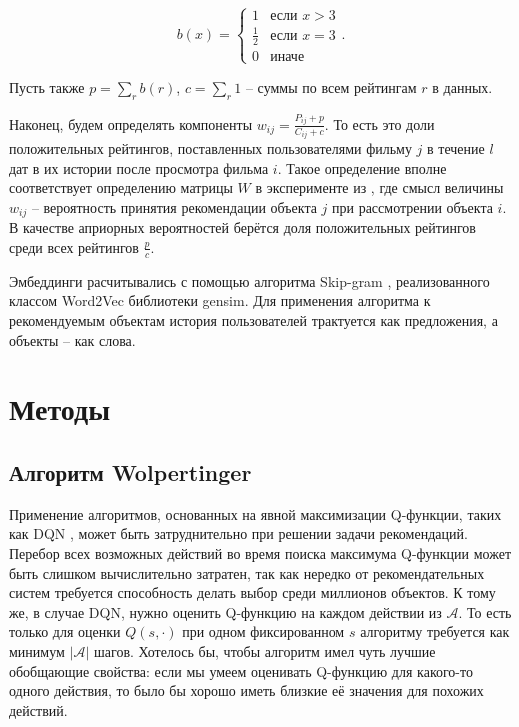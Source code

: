 \documentclass[a4paper, 12pt]{article}
\begin{document}
$$
b(x)=
	\begin{cases}
		1 & \text{если } x > 3\\
		\frac12 & \text{если } x = 3\\
		0 & \text{иначе} 
	\end{cases}.
$$

Пусть также $p = \sum_r b(r)$, $c = \sum_r 1$ -- суммы по всем рейтингам $r$ в данных.

Наконец, будем определять компоненты $w_{ij} = \frac{P_{ij} + p}{C_{ij} + c}$.
То есть это доли положительных рейтингов, поставленных пользователями фильму $j$ в течение $l$ дат в их истории после просмотра фильма $i$. Такое определение вполне соответствует определению матрицы $W$ в эксперименте из \cite{wolpertinger}, где смысл величины $w_{ij}$ -- вероятность принятия рекомендации объекта $j$ при рассмотрении объекта $i$.
В качестве априорных вероятностей берётся доля положительных рейтингов среди всех рейтингов $\frac{p}{c}$.

Эмбеддинги расчитывались с помощью алгоритма Skip-gram \cite{skip_gram}, реализованного классом Word2Vec  библиотеки gensim. Для применения алгоритма к рекомендуемым объектам история пользователей трактуется как предложения, а объекты -- как слова. 




\section{Методы}

\subsection{Алгоритм Wolpertinger}

Применение алгоритмов, основанных на явной максимизации Q-функ\-ции, таких как DQN \cite{dqn}, может быть затруднительно при решении задачи рекомендаций. 
Перебор всех возможных действий во время поиска максимума Q-функции может быть слишком вычислительно затратен, так как нередко от рекомендательных систем требуется способность делать выбор среди миллионов объектов.
К тому же, в случае DQN, нужно оценить Q-функцию на каждом действии из $\mathcal{A}$.  То есть только для оценки $Q(s, \cdot)$ при одном фиксированном $s$ алгоритму требуется как минимум $|\mathcal{A}|$ шагов. Хотелось бы, чтобы алгоритм имел чуть лучшие обобщающие свойства: если мы умеем оценивать Q-функцию для какого-то одного действия, то было бы хорошо иметь близкие её значения для похожих действий. 
\end{document}
